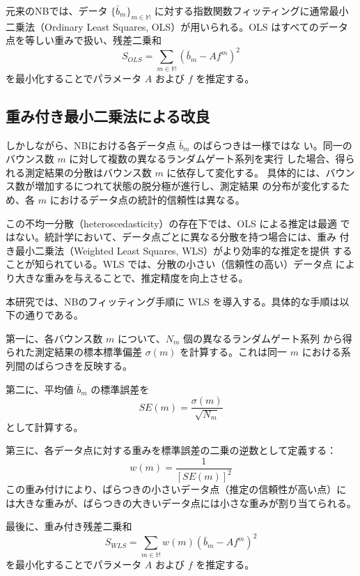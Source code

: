\documentclass[12pt,a4paper,titlepage,dvipdfmx]{article}
\begin{document}
元来のNBでは、データ $\{\bar{b}_m\}_{m \in \mathbb{M}}$ に対する指数関数フィッティングに通常最小二乗法（Ordinary Least Squares, OLS）が用いられる。OLS はすべてのデータ点を等しい重みで扱い、残差二乗和
\begin{equation}
S_{OLS} = \sum_{m \in \mathbb{M}} (\bar{b}_m - A f^m)^2
\end{equation}
を最小化することでパラメータ $A$ および $f$ を推定する。


\subsection{重み付き最小二乗法による改良}
しかしながら、NBにおける各データ点 $\bar{b}_m$ のばらつきは一様ではな
い。同一のバウンス数 $m$ に対して複数の異なるランダムゲート系列を実行
した場合、得られる測定結果の分散はバウンス数 $m$ に依存して変化する。
具体的には、バウンス数が増加するにつれて状態の脱分極が進行し、測定結果
の分布が変化するため、各 $m$ におけるデータ点の統計的信頼性は異なる。

この不均一分散（heteroscedasticity）の存在下では、OLS による推定は最適
ではない。統計学において、データ点ごとに異なる分散を持つ場合には、重み
付き最小二乗法（Weighted Least Squares, WLS）がより効率的な推定を提供
することが知られている。WLS では、分散の小さい（信頼性の高い）データ点
により大きな重みを与えることで、推定精度を向上させる。

本研究では、NBのフィッティング手順に WLS を導入する。具体的な手順は以
下の通りである。

第一に、各バウンス数 $m$ について、$N_m$ 個の異なるランダムゲート系列
から得られた測定結果の標本標準偏差 $\sigma(m)$ を計算する。これは同一
$m$ における系列間のばらつきを反映する。

第二に、平均値 $\bar{b}_m$ の標準誤差を
\begin{equation}
SE(m) = \frac{\sigma(m)}{\sqrt{N_m}}
\end{equation}
として計算する。

第三に、各データ点に対する重みを標準誤差の二乗の逆数として定義する：
\begin{equation}
w(m) = \frac{1}{[SE(m)]^2}
\end{equation}
この重み付けにより、ばらつきの小さいデータ点（推定の信頼性が高い点）に
は大きな重みが、ばらつきの大きいデータ点には小さな重みが割り当てられる。

最後に、重み付き残差二乗和
\begin{equation}
S_{WLS} = \sum_{m \in \mathbb{M}} w(m) (\bar{b}_m - A f^m)^2
\end{equation}
を最小化することでパラメータ $A$ および $f$ を推定する。
\end{document}
